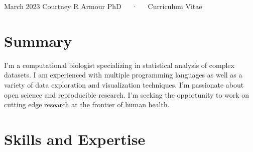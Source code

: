 \documentclass[11pt,a4paper,]{awesome-cv}
\begin{document}
\makecvheader

\makecvfooter
  {March 2023}
    { Courtney R Armour PhD~~~·~~~Curriculum Vitae}
  {\thepage}






\hypertarget{summary}{%
\section{Summary}\label{summary}}

I'm a computational biologist specializing in statistical analysis of
complex datasets. I am experienced with multiple programming languages
as well as a variety of data exploration and visualization techniques.
I'm passionate about open science and reproducible research. I'm seeking
the opportunity to work on cutting edge research at the frontier of
human health.

\hypertarget{skills-and-expertise}{%
\section{\texorpdfstring{\faCogs Skills and
Expertise}{Skills and Expertise}}\label{skills-and-expertise}}
\end{document}
